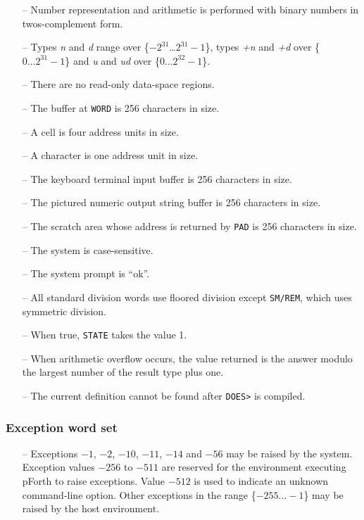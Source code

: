 \documentclass[english]{article}
\newcommand{\spic}[1]{{\it #1\/}}
\begin{document}
\begin{itemize}
\item[--]Number representation and arithmetic is performed with binary numbers in twos-complement form.
\item[--]Types \spic{n} and \spic{d} range over \{$-2^{31}$\dots $2^{31}-1$\}, types \spic{+n} and \spic{+d} over \{$0\dots 2^{31}-1$\} and \spic{u} and \spic{ud} over \{$0\dots 2^{32}-1$\}.
\item[--]There are no read-only data-space regions.
\item[--]The buffer at {\tt WORD} is 256 characters in size.
\item[--]A cell is four address units in size.
\item[--]A character is one address unit in size.
\item[--]The keyboard terminal input buffer is 256 characters in size.
\item[--]The pictured numeric output string buffer is 256 characters in size.
\item[--]The scratch area whose address is returned by {\tt PAD} is 256 characters in size.
\item[--]The system is case-sensitive.
\item[--]The system prompt is ``ok''.
\item[--]All standard division words use floored division except {\tt SM/REM}, which uses symmetric division.
\item[--]When true, {\tt STATE} takes the value 1.
\item[--]When arithmetic overflow occurs, the value returned is the answer modulo the largest number of the result type plus one.
\item[--]The current definition cannot be found after {\tt DOES>} is compiled.
\end{itemize}

\subsubsection{Exception word set}

\begin{itemize}
\item[--]Exceptions $-1$, $-2$, $-10$, $-11$, $-14$ and $-56$ may be raised by the system. Exception values $-256$ to $-511$ are reserved for the environment executing pForth to raise exceptions. Value $-512$ is used to indicate an unknown command-line option. Other exceptions in the range \{$-255\dots -1$\} may be raised by the host environment.
\end{itemize}
\end{document}

